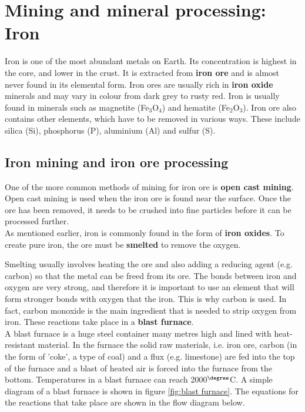 
\section{Mining and mineral processing: Iron}
\label{sec:mining:iron}

Iron is one of the most abundant metals on Earth. Its concentration is highest in the core, and lower in the crust. It is extracted from \textbf{iron ore} and is almost never found in its elemental form. Iron ores are usually rich in \textbf{iron oxide} minerals and may vary in colour from dark grey to rusty red. Iron is usually found in minerals such as magnetite (Fe$_{3}$O$_{4}$) and hematite (Fe$_{2}$O$_{3}$). Iron ore also contains other elements, which have to be removed in various ways. These include silica (Si), phosphorus (P), aluminium (Al) and sulfur (S).

\subsection{Iron mining and iron ore processing}

One of the more common methods of mining for iron ore is \textbf{open cast mining}. Open cast mining is used when the iron ore is found near the surface. Once the ore has been removed, it needs to be crushed into fine particles before it can be processed further.\\

As mentioned earlier, iron is commonly found in the form of \textbf{iron oxides}. To create pure iron, the ore must be \textbf{smelted} to remove the oxygen. 


Smelting usually involves heating the ore and also adding a reducing agent (e.g. carbon) so that the metal can be freed from its ore. The bonds between iron and oxygen are very strong, and therefore it is important to use an element that will form stronger bonds with oxygen that the iron. This is why carbon is used. In fact, carbon monoxide is the main ingredient that is needed to strip oxygen from iron. These reactions take place in a \textbf{blast furnace}.\\

A blast furnace is a huge steel container many metres high and lined with heat-resistant material. In the furnace the solid raw materials, i.e. iron ore, carbon (in the form of 'coke', a type of coal) and a flux (e.g. limestone) are fed into the top of the furnace and a blast of heated air is forced into the furnace from the bottom. Temperatures in a blast furnace can reach 2000$^{\degree}$C. A simple diagram of a blast furnace is shown in figure \ref{fig:blast furnace}. The equations for the reactions that take place are shown in the flow diagram below. \\

